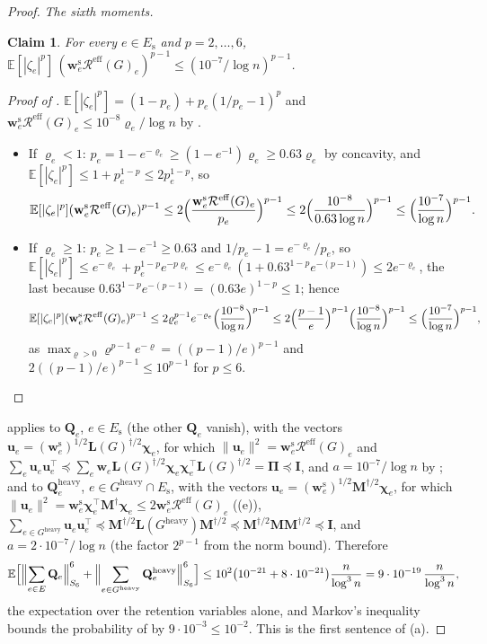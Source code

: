 \documentclass[11pt]{article}
\newtheorem{claim}[theorem]{Claim}
\theoremstyle{remark}
\newcommand{\cchi}{{\boldsymbol\chi}}
\newcommand{\II}{\mathbf I}
\newcommand{\LL}{\mathbf L}
\newcommand{\MM}{\mathbf M}
\newcommand{\PPi}{{\boldsymbol\Pi}}
\newcommand{\QQ}{\mathbf Q}
\newcommand{\uu}{\mathbf u}
\newcommand{\ww}{\mathbf w}
\newcommand{\Gh}{G^{\mathrm{heavy}}}
\newcommand{\Rcal}{\mathcal{R}}
\newcommand{\Reff}{\Rcal^{\mathrm{eff}}}
\newcommand{\Ex}{\mathbb E}
\newcommand{\norm}[1]{\lVert#1\rVert}
\begin{document}
\begin{proof}
\emph{The sixth moments.}
\begin{claim}\label{clm:zeta}
For every $e\in E_{\mathrm{s}}$ and $p=2,\dots,6$,
$\Ex[|\zeta_e|^{p}]\,(\ww^{\mathrm{s}}_e\Reff(G)_e)^{p-1}\le(10^{-7}/\log n)^{p-1}$.
\end{claim}
\begin{proof}[Proof of ]
$\Ex[|\zeta_e|^{p}]=(1-p_e)+p_e(1/p_e-1)^{p}$ and
$\ww^{\mathrm{s}}_e\Reff(G)_e\le10^{-8}\varrho_e/\log n$ by .
\begin{itemize}[leftmargin=*]
\item If $\varrho_e<1$: $p_e=1-e^{-\varrho_e}\ge(1-e^{-1})\varrho_e\ge0.63\varrho_e$
by concavity, and $\Ex[|\zeta_e|^{p}]\le1+p_e^{1-p}\le2p_e^{1-p}$, so
\[
\Ex[|\zeta_e|^{p}](\ww^{\mathrm{s}}_e\Reff(G)_e)^{p-1}
\le2\Bigl(\frac{\ww^{\mathrm{s}}_e\Reff(G)_e}{p_e}\Bigr)^{p-1}
\le2\Bigl(\frac{10^{-8}}{0.63\log n}\Bigr)^{p-1}
\le\Bigl(\frac{10^{-7}}{\log n}\Bigr)^{p-1}.
\]
\item If $\varrho_e\ge1$: $p_e\ge1-e^{-1}\ge0.63$ and $1/p_e-1=e^{-\varrho_e}/p_e$, so
$\Ex[|\zeta_e|^{p}]\le e^{-\varrho_e}+p_e^{1-p}e^{-p\varrho_e}\le e^{-\varrho_e}(1+0.63^{1-p}e^{-(p-1)})\le2e^{-\varrho_e}$,
the last because $0.63^{1-p}e^{-(p-1)}=(0.63e)^{1-p}\le1$; hence
\[
\Ex[|\zeta_e|^{p}](\ww^{\mathrm{s}}_e\Reff(G)_e)^{p-1}
\le2\varrho_e^{p-1}e^{-\varrho_e}\Bigl(\frac{10^{-8}}{\log n}\Bigr)^{p-1}
\le2\Bigl(\frac{p-1}{e}\Bigr)^{p-1}\Bigl(\frac{10^{-8}}{\log n}\Bigr)^{p-1}
\le\Bigl(\frac{10^{-7}}{\log n}\Bigr)^{p-1},
\]
as $\max_{\varrho>0}\varrho^{p-1}e^{-\varrho}=((p-1)/e)^{p-1}$ and
$2((p-1)/e)^{p-1}\le10^{p-1}$ for $p\le6$.
\qedhere
\end{itemize}
\end{proof}
 applies to $\QQ_e$, $e\in E_{\mathrm{s}}$ (the other
$\QQ_e$ vanish), with the vectors
$\uu_e=(\ww^{\mathrm{s}}_e)^{1/2}\LL(G)^{\dag/2}\cchi_e$, for which
$\norm{\uu_e}^{2}=\ww^{\mathrm{s}}_e\Reff(G)_e$ and
$\sum_e\uu_e\uu_e^{\top}\preceq\sum_e\ww_e\LL(G)^{\dag/2}\cchi_e\cchi_e^{\top}\LL(G)^{\dag/2}=\PPi\preceq\II$,
and $a=10^{-7}/\log n$ by ; and to $\QQ^{\mathrm{heavy}}_e$,
$e\in\Gh\cap E_{\mathrm{s}}$, with the vectors
$\uu_e=(\ww^{\mathrm{s}}_e)^{1/2}\MM^{\dag/2}\cchi_e$, for which
$\norm{\uu_e}^{2}=\ww^{\mathrm{s}}_e\cchi_e^{\top}\MM^{\dag}\cchi_e\le2\ww^{\mathrm{s}}_e\Reff(G)_e$
((e)),
$\sum_{e\in\Gh}\uu_e\uu_e^{\top}\preceq\MM^{\dag/2}\LL(\Gh)\MM^{\dag/2}\preceq\MM^{\dag/2}\MM\MM^{\dag/2}\preceq\II$,
and $a=2\cdot10^{-7}/\log n$ (the factor $2^{p-1}$ from the norm bound).
Therefore
\[
\Ex\Bigl[\Bigl\|\sum_{e\in E}\QQ_e\Bigr\|_{S_6}^{6}
+\Bigl\|\sum_{e\in\Gh}\QQ^{\mathrm{heavy}}_e\Bigr\|_{S_6}^{6}\Bigr]
\le10^{2}\bigl(10^{-21}+8\cdot10^{-21}\bigr)\frac{n}{\log^{3}n}
=9\cdot10^{-19}\,\frac{n}{\log^{3}n},
\]
the expectation over the retention variables alone, and Markov's inequality
bounds the probability of  by $9\cdot10^{-3}\le10^{-2}$.
This is the first sentence of (a).


\end{proof}
\end{document}
